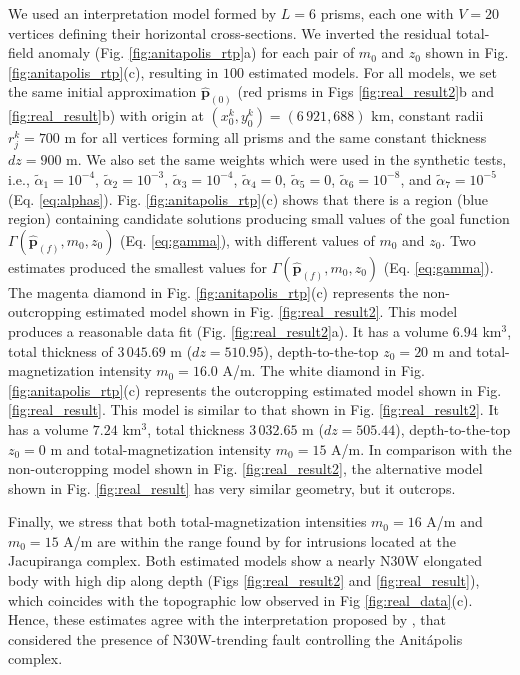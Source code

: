 We used an interpretation model formed by $L = 6$ prisms, each one with 
$V = 20$ vertices defining their horizontal cross-sections.
We inverted the residual total-field anomaly (Fig. \ref{fig:anitapolis_rtp}a) for each 
pair of $m_0$ and $z_0$ shown in Fig. \ref{fig:anitapolis_rtp}(c), resulting in $100$ estimated 
models. 
For all models, we set the same initial approximation $\hat{\mathbf{p}}_{(0)}$ 
(red prisms in Figs \ref{fig:real_result2}b and \ref{fig:real_result}b) 
with origin at $(x_0^k, y_0^k) = (6\,921, 688)$ km, constant radii $r_j^k = 700$ m for 
all vertices forming all prisms and the same constant thickness $dz = 900$ m.
We also set the same weights which were used in the synthetic tests, i.e., 
$\tilde{\alpha}_1 = 10^{-4}$, 
$\tilde{\alpha}_2 = 10^{-3}$, 
$\tilde{\alpha}_3 = 10^{-4}$, 
$\tilde{\alpha}_4 = 0$, 
$\tilde{\alpha}_5 = 0$, 
$\tilde{\alpha}_6 = 10^{-8}$, and 
$\tilde{\alpha}_7 = 10^{-5}$ (Eq. \ref{eq:alphas}). 
Fig. \ref{fig:anitapolis_rtp}(c) shows that there is a region (blue region) containing 
candidate solutions producing small values of the goal function 
$\Gamma (\hat{\mathbf{p}}_{(f)}, m_{0}, z_{0})$ (Eq. \ref{eq:gamma}), with different values of $m_0$ and $z_0$.
Two estimates produced the smallest values for $\Gamma (\hat{\mathbf{p}}_{(f)}, m_{0}, z_{0})$ (Eq. \ref{eq:gamma}). 
The magenta diamond in Fig. \ref{fig:anitapolis_rtp}(c) represents the 
non-outcropping estimated model shown in Fig. \ref{fig:real_result2}. 
This model produces a reasonable data fit (Fig. \ref{fig:real_result2}a). 
It has a volume $ 6.94 $ km$ ^3 $, total thickness of $ 3\,045.69 $ m 
($ dz = 510.95 $), depth-to-the-top $z_0 = 20$ m and total-magnetization intensity 
$m_0 = 16.0$ A/m.
The white diamond in Fig. \ref{fig:anitapolis_rtp}(c) represents the outcropping estimated  
model shown in Fig. \ref{fig:real_result}. This model is similar to that shown in 
Fig. \ref{fig:real_result2}. It has a volume $ 7.24 $ km$ ^3 $, total thickness 
$ 3\,032.65 $ m ($ dz = 505.44 $), depth-to-the-top $z_0 = 0$ m and 
total-magnetization intensity $m_0 = 15$ A/m.  
In comparison with the non-outcropping model shown in Fig. \ref{fig:real_result2}, the 
alternative model shown in Fig. \ref{fig:real_result} has very similar geometry,
but it outcrops.

Finally, we stress that both total-magnetization intensities $m_0 = 16$  A/m and  $m_0 = 15$ A/m 
are within the range found by  \citet{valdivia-2009} for intrusions located at the Jacupiranga complex.
Both estimated models show a nearly N30W elongated body with high dip 
along depth (Figs \ref{fig:real_result2} and \ref{fig:real_result}), 
which coincides with the topographic low observed in Fig \ref{fig:real_data}(c). 
Hence, these estimates agree with the interpretation proposed by 
\citet{horbach-marimon1980}, that considered the presence of N30W-trending fault 
controlling the Anit{\'a}polis complex.